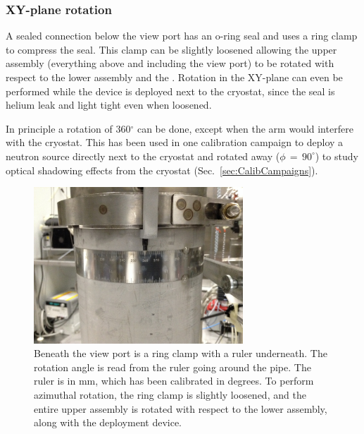 \subsubsection*{XY-plane rotation}\label{sec:XYrotation}
A sealed connection below the view port has an o-ring seal and uses a ring clamp to compress the seal. This clamp can be slightly loosened allowing the upper assembly (everything above and including the view port) to be rotated with respect to the lower assembly and the \tpc. Rotation in the XY-plane can even be performed while the device is deployed next to the cryostat, since the seal is helium leak and light tight even when loosened.

In principle a rotation of 360$^\circ$ can be done, except when the arm would interfere with the cryostat. This has been used in one calibration campaign to deploy a neutron source directly next to the cryostat and rotated away ($\phi\,=\,90^\circ$) to study optical shadowing effects from the cryostat (Sec.~\ref{sec:CalibCampaigns}). 





\begin{figure}[htbp]
 \centering
  \includegraphics[width=0.7\textwidth]{Figures/RingClamp_WithPin_IMG_2669.JPG}
  \caption{Beneath the view port is a ring clamp with a ruler underneath. The rotation angle is read from the ruler going around the pipe. The ruler is in mm, which has been calibrated in degrees. To perform azimuthal rotation, the ring clamp is slightly loosened, and the entire upper assembly is rotated with respect to the lower assembly, along with the deployment device.}
  \label{fig:ring_clamp}
\end{figure} 

